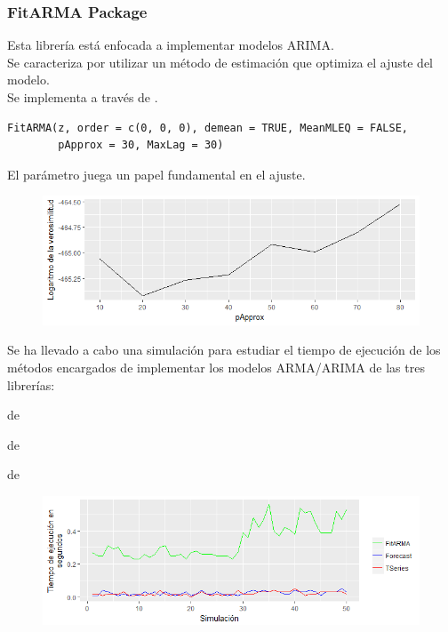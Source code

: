 \documentclass[10pt,a4paper,twoside]{beamer}
\begin{document}
\begin{frame}[fragile]
\frametitle{FitARMA Package}
Esta librería está enfocada a implementar modelos ARIMA.\\
Se caracteriza por utilizar un método de estimación que optimiza el ajuste del modelo.\\
Se implementa a través de .
\begin{Verbatim}[fontsize=\footnotesize]
FitARMA(z, order = c(0, 0, 0), demean = TRUE, MeanMLEQ = FALSE,
        pApprox = 30, MaxLag = 30)
\end{Verbatim}

El parámetro  juega un papel fundamental en el ajuste.

\begin{figure}
    \centering
    \centerline{\includegraphics[scale = 0.5]{Images/330.png}}
\end{figure}

\end{frame}


\begin{frame}
Se ha llevado a cabo una simulación para estudiar el tiempo de ejecución de los métodos encargados de implementar los modelos ARMA/ARIMA de las tres librerías:
\begin{itemize*}
\item {} de 
\item {} de 
\item {} de 
\end{itemize*}

\begin{figure}
    \centering
    \centerline{\includegraphics[scale = 0.6]{Images/331.png}}
\end{figure}

\end{frame}
\end{document}
